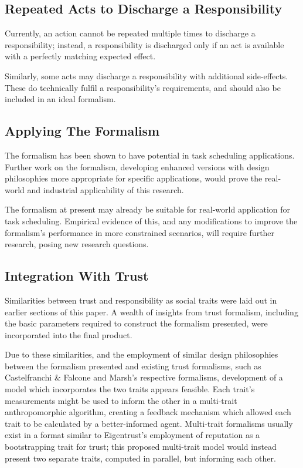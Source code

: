 \subsection{Repeated Acts to Discharge a Responsibility}
Currently, an action cannot be repeated multiple times to discharge a responsibility; instead, a responsibility is discharged only if an act is available with a perfectly matching expected effect.\par

Similarly, some acts may discharge a responsibility with additional side-effects. These do technically fulfil a responsibility's requirements, and should also be included in an ideal formalism.\par

\subsection{Applying The Formalism}
The formalism has been shown to have potential in task scheduling applications. Further work on the formalism, developing enhanced versions with design philosophies more appropriate for specific applications, would prove the real-world and industrial applicability of this research.\par

The formalism at present may already be suitable for real-world application for task scheduling. Empirical evidence of this, and any modifications to improve the formalism's performance in more constrained scenarios, will require further research, posing new research questions.\par

\subsection{Integration With Trust}\label{subsec:multi-trait}
Similarities between trust and responsibility as social traits were laid out in earlier sections of this paper. A wealth of insights from trust formalism, including the basic parameters required to construct the formalism presented, were incorporated into the final product.\par

Due to these similarities, and the employment of similar design philosophies between the formalism presented and existing trust formalisms, such as Castelfranchi \& Falcone and Marsh's respective formalisms, development of a model which incorporates the two traits appears feasible. Each trait's measurements might be used to inform the other in a multi-trait anthropomorphic algorithm, creating a feedback mechanism which allowed each trait to be calculated by a better-informed agent. Multi-trait formalisms usually exist in a format similar to Eigentrust's employment of reputation as a bootstrapping trait for trust; this proposed multi-trait model would instead present two separate traits, computed in parallel, but informing each other.\par


